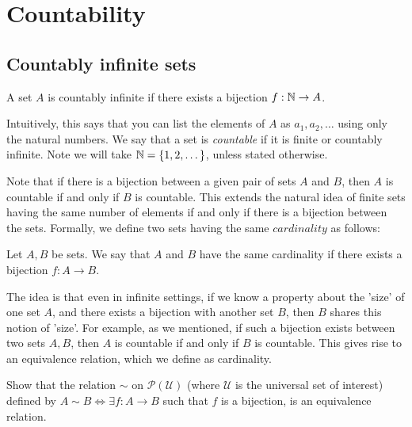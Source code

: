 \documentclass[../analysis1.tex]{subfiles}
\begin{document}
\chapter{Countability}


\section{Countably infinite sets}
\begin{definition}
    \begin{shaded*}
        A set $A$ is countably infinite if there exists a bijection $f:\mathbb{N}\to A$.
    \end{shaded*}
\end{definition}
\noindent Intuitively, this says that you can list the elements of $A$ as $a_1,a_2,\dots$ using only the natural numbers.
We say that a set is \textit{countable} if it is finite or countably infinite. Note we will take $\mathbb{N}=\{1,2,\dots\}$, unless stated otherwise.\par
Note that if there is a bijection between a given pair of sets $A$ and $B$, then $A$ is countable if and only if $B$ is countable.
This extends the natural idea of finite sets having the same number of elements if and only if there is a bijection between the sets. Formally, we define two sets having the same $cardinality$ as follows:
\begin{definition}
    \begin{shaded*}
        Let $A,B$ be sets. We say that $A$ and $B$ have the same cardinality if there exists a bijection $f:A\to B$.
    \end{shaded*}
\end{definition}
The idea is that even in infinite settings, if we know a property about the 'size' of one set $A$, and there exists a bijection with another set $B$, then $B$ shares this notion of 'size'.
For example, as we mentioned, if such a bijection exists between two sets $A,B$, then $A$ is countable if and only if $B$ is countable. 
This gives rise to an equivalence relation, which we define as cardinality.
\begin{exercise*}
    Show that the relation $\sim$ on $\mathcal{P}(\mathcal{U})$ (where $\mathcal{U}$ is the universal set of interest) defined by $A\sim B \iff \exists f:A\to B$ such that $f$ is a bijection, is an equivalence relation.
\end{exercise*}
\end{document}
